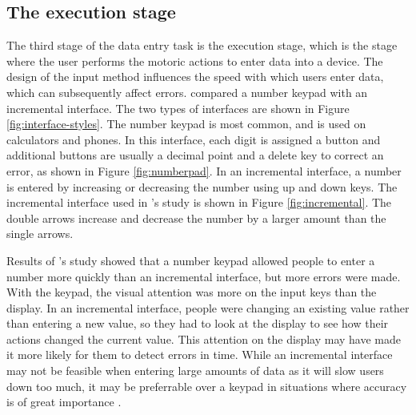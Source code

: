 \subsection{The execution stage}
The third stage of the data entry task is the execution stage, which is the stage where the user performs the motoric actions to enter data into a device. The design of the input method influences the speed with which users enter data, which can subsequently affect errors. \citet{Oladimeji2011} compared a number keypad with an incremental interface. The two types of interfaces are shown in Figure \ref{fig:interface-styles}. The number keypad is most common, and is used on calculators and phones. In this interface, each digit is assigned a button and additional buttons are usually a decimal point and a delete key to correct an error, as shown in Figure \ref{fig:numberpad}. In an incremental interface, a number is entered by increasing or decreasing the number using up and down keys. The incremental interface used in \citeauthor{Oladimeji2011}'s study is shown in Figure \ref{fig:incremental}. The double arrows increase and decrease the number by a larger amount than the single arrows. 

Results of \citeauthor{Oladimeji2011}'s study showed that a number keypad allowed people to enter a number more quickly than an incremental interface, but more errors were made. With the keypad, the visual attention was more on the input keys than the display. In an incremental interface, people were changing an existing value rather than entering a new value, so they had to look at the display to see how their actions changed the current value. This attention on the display may have made it more likely for them to detect errors in time. While an incremental interface may not be feasible when entering large amounts of data as it will slow users down too much, it may be preferrable over a keypad in situations where accuracy is of great importance \citep{Thimbleby2011}.

